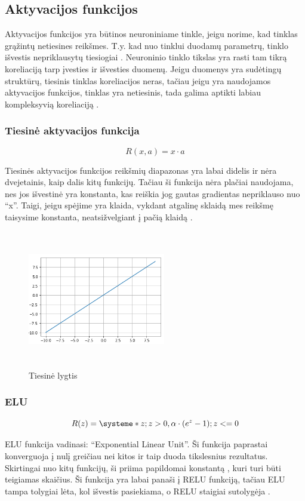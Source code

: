 \documentclass{VUMIFInfKursinis}
\begin{document}
\subsection{Aktyvacijos funkcijos}
\par
Aktyvacijos funkcijos yra būtinos neuroniniame tinkle, jeigu norime, kad tinklas
grąžintų netiesines reikšmes. T.y. kad nuo tinklui duodamų parametrų, tinklo išvestis
nepriklausytų tiesiogiai \cite{salt18}. Neuroninio tinklo tikslas yra rasti tam tikrą
koreliaciją tarp įvesties ir išvesties duomenų. Jeigu duomenys yra sudėtingų struktūrų,
tiesinis tinklas koreliacijos neras, tačiau jeigu yra naudojamos aktyvacijos funkcijos,
tinklas yra netiesinis, tada galima aptikti labiau kompleksyvią koreliaciją \cite{salt18}.

\subsubsection{Tiesinė aktyvacijos funkcija}
\begin{equation}\label{eqn:lygtis}
R(x, a) = x \cdot a
\end{equation}
\par
Tiesinės aktyvacijos funkcijos reikšmių diapazonas yra labai didelis ir nėra dvejetainis,
kaip dalis kitų funkcijų. Tačiau ši funkcija nėra plačiai naudojama, nes jos
išvestinė yra konstanta, kas reiškia jog gautas gradientas nepriklauso nuo \enquote{x}.
Taigi, jeigu spėjime yra klaida, vykdant atgalinę sklaidą mes reikšmę taisysime
konstanta, neatsižvelgiant į pačią klaidą \cite{salt16}.

\begin{figure}[ht]
  \centering
  \includegraphics[width=6cm,height=6cm,keepaspectratio]{tiesine.png}
  \caption{Tiesinė lygtis}
  \label{fig:lygtis1}
\end{figure}

\subsubsection{ELU}
\begin{equation}
  R(z) = \systeme*{z; z > 0, \alpha \cdot (e^z - 1); z <= 0}
\end{equation}
\par
ELU funkcija vadinasi: \enquote{Exponential Linear Unit}. Ši funkcija paprastai konverguoja į
nulį greičiau nei kitos ir taip duoda tikslesnius rezultatus. Skirtingai nuo kitų
funkcijų, ši priima papildomai konstantą , kuri turi būti teigiamas skaičius.
Ši funkcija yra labai panaši į RELU funkciją, tačiau ELU tampa tolygiai lėta,
kol išvestis pasiekiama, o RELU staigiai sutolygėja \cite{salt16}.
\end{document}

